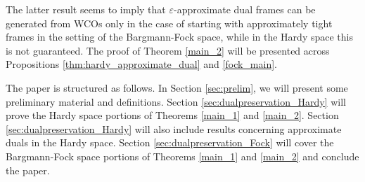 \documentclass{amsart}
\theoremstyle{definition}
\theoremstyle{remark}
\numberwithin{equation}{section}
\begin{document}
The latter result seems to imply that $\varepsilon$-approximate dual frames can be generated from WCOs only in the case of starting with approximately tight frames in the setting of the Bargmann-Fock space, while in the Hardy space this is not guaranteed. The proof of Theorem \ref{main_2} will be presented across Propositions \ref{thm:hardy_approximate_dual} and \ref{fock_main}. 

The paper is structured as follows. In Section \ref{sec:prelim}, we will present some preliminary material and definitions. Section \ref{sec:dualpreservation_Hardy} will prove the Hardy space portions of Theorems \ref{main_1} and \ref{main_2}. Section \ref{sec:dualpreservation_Hardy} will also include results concerning approximate duals in the Hardy space. Section \ref{sec:dualpreservation_Fock} will cover the Bargmann-Fock space portions of Theorems \ref{main_1} and \ref{main_2} and conclude the paper. 
\end{document}
